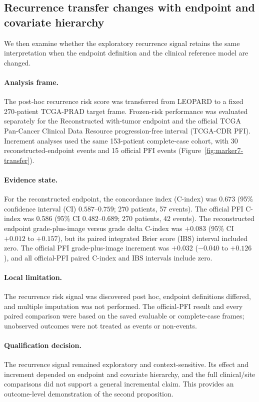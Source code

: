 \subsection{Recurrence transfer changes with endpoint and covariate hierarchy}

We then examine whether the exploratory recurrence signal retains the same interpretation
when the endpoint definition and the clinical reference model are changed.

\paragraph{Analysis frame.}
The post-hoc recurrence risk score was transferred from LEOPARD to a fixed 270-patient
TCGA-PRAD target frame. Frozen-risk performance was evaluated separately for the
Reconstructed with-tumor endpoint and the official TCGA Pan-Cancer Clinical Data Resource
progression-free interval (TCGA-CDR PFI). Increment analyses used the
same 153-patient complete-case cohort, with 30 reconstructed-endpoint events and 15 official
PFI events (Figure~\ref{fig:marker7-transfer}).

\paragraph{Evidence state.}
For the reconstructed endpoint, the concordance index (C-index) was $0.673$ (95\%
confidence interval (CI)
$0.587$--$0.759$; 270 patients, 57 events). The official PFI C-index was 0.586
(95\% CI 0.482--0.689; 270 patients, 42 events). The reconstructed endpoint
grade-plus-image versus grade delta C-index was $+0.083$ (95\% CI $+0.012$ to
$+0.157$), but its paired integrated Brier score (IBS) interval included zero. The official PFI
grade-plus-image increment was $+0.032$ ($-0.040$ to $+0.126$), and all official-PFI
paired C-index and IBS intervals include zero.

\paragraph{Local limitation.}
The recurrence risk signal was discovered post hoc, endpoint definitions differed, and multiple imputation
was not performed. The official-PFI result and every paired comparison were based on the
saved evaluable or complete-case frames; unobserved outcomes were not treated as events or
non-events.

\paragraph{Qualification decision.}
The recurrence signal remained exploratory and context-sensitive. Its effect and increment
depended on endpoint and covariate hierarchy, and the full clinical/site comparisons did
not support a general incremental claim. This provides an outcome-level demonstration of
the second proposition.

